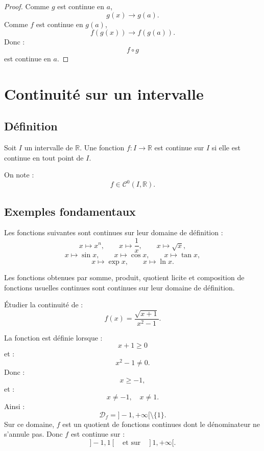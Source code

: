 \documentclass[11pt,a4paper]{article}
\newcommand{\R}{\mathbb R}
\newcommand{\Df}{\mathcal D_f}
\begin{document}
\begin{proof}
Comme \(g\) est continue en \(a\),
\[
g(x)\to g(a).
\]
Comme \(f\) est continue en \(g(a)\),
\[
f(g(x))\to f(g(a)).
\]
Donc :
\[
f\circ g
\]
est continue en \(a\).
\end{proof}

\section{Continuité sur un intervalle}

\subsection{Définition}

\begin{definitionbox}
Soit \(I\) un intervalle de \(\R\).  
Une fonction \(f:I\to\R\) est continue sur \(I\) si elle est continue en tout point de \(I\).
\end{definitionbox}

On note :
\[
f\in\mathcal C^0(I,\R).
\]

\subsection{Exemples fondamentaux}

\begin{theorembox}
Les fonctions suivantes sont continues sur leur domaine de définition :
\[
x\mapsto x^n,
\qquad
x\mapsto \frac1x,
\qquad
x\mapsto \sqrt{x},
\]
\[
x\mapsto \sin x,
\qquad
x\mapsto \cos x,
\qquad
x\mapsto \tan x,
\]
\[
x\mapsto \exp x,
\qquad
x\mapsto \ln x.
\]
\end{theorembox}

\begin{retenirbox}
Les fonctions obtenues par somme, produit, quotient licite et composition de fonctions usuelles continues sont continues sur leur domaine de définition.
\end{retenirbox}

\begin{exercicebox}[Continuité]
Étudier la continuité de :
\[
f(x)=\frac{\sqrt{x+1}}{x^2-1}.
\]
\end{exercicebox}

\begin{correctionbox}
La fonction est définie lorsque :
\[
x+1\geq0
\]
et :
\[
x^2-1\neq0.
\]
Donc :
\[
x\geq -1,
\]
et :
\[
x\neq -1,\quad x\neq1.
\]
Ainsi :
\[
\Df=]-1,+\infty[\setminus\{1\}.
\]
Sur ce domaine, \(f\) est un quotient de fonctions continues dont le dénominateur ne s'annule pas.  
Donc \(f\) est continue sur :
\[
]-1,1[
\quad\text{et sur}\quad
]1,+\infty[.
\]
\end{correctionbox}
\end{document}

